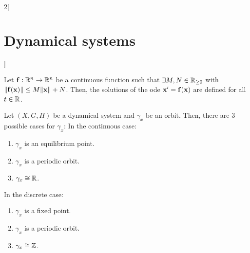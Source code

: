 \documentclass[../../../main.tex]{subfiles}
\begin{document}
\begin{multicols}{2}[\section{Dynamical systems}]
\begin{lemma}
    Let $\boldsymbol{\mathrm{f}}:\mathbb{R}^n\rightarrow\mathbb{R}^n$ be a continuous function such that $\exists M,N\in\mathbb{R}_{\geq 0}$ with $\|\boldsymbol{\mathrm{f}}(\boldsymbol{\mathrm{x}})\|\leq M\|\boldsymbol{\mathrm{x}}\|+N$. Then, the solutions of the ode $\boldsymbol{\mathrm{x}}' =\boldsymbol{\mathrm{f}}(\boldsymbol{\mathrm{x}})$ are defined for all $t\in\mathbb{R}$.
  \end{lemma}
  \begin{theorem}
    Let $(X,G,\Pi)$ be a dynamical system and $\gamma_x$ be an orbit. Then, there are 3 possible cases for $\gamma_x$:
    In the continuous case:
    \begin{enumerate}
      \item $\gamma_x$ is an equilibrium point.
      \item $\gamma_x$ is a periodic orbit.
      \item $\gamma_x\cong\mathbb{R}$.
    \end{enumerate}
    In the discrete case:
    \begin{enumerate}
      \item $\gamma_x$ is a fixed point.
      \item $\gamma_x$ is a periodic orbit.
      \item $\gamma_x\cong\mathbb{Z}$.
    \end{enumerate}
  \end{theorem}

\end{multicols}
\end{document}
